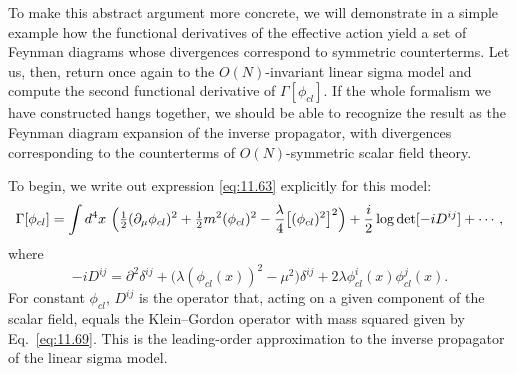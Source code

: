 To make this abstract argument more concrete, we will demonstrate in a simple
example how the functional derivatives of the effective action yield a set of
Feynman diagrams whose divergences correspond to symmetric counterterms.  Let
us, then, return once again to the $O(N)$-invariant linear sigma model and
compute the second functional derivative of $\Gamma[\phi_{cl}]$.  If the whole
formalism we have constructed hangs together, we should be able to recognize
the result as the Feynman diagram expansion of the inverse propagator, with
divergences corresponding to the counterterms of $O(N)$-symmetric scalar
field theory.

To begin, we write out expression \eqref{eq:11.63} explicitly for this model:
\begin{equation}
  \Gamma[\phi_{cl}] = \int d^4x\ \Bigl( \tfrac{1}{2}(\partial_\mu\phi_{cl})^2
    + \tfrac{1}{2}m^2(\phi_{cl})^2 - \frac{\lambda}{4}\bigl[ (\phi_{cl})^2
      \bigr]^2 \Bigr) + \frac{i}{2}\log\det[-iD^{ij}] + \cdots ,
  \label{eq:11.99}
\end{equation}
where
\begin{equation}
  -iD^{ij} = \partial^2\delta^{ij} + \bigl( \lambda(\phi_{cl}(x))^2 - \mu^2
    \bigr)\delta^{ij} + 2\lambda\phi^i_{cl}(x)\phi^j_{cl}(x) .
  \label{eq:11.100}
\end{equation}
For constant $\phi_{cl}$, $D^{ij}$ is the operator that, acting on a given
component of the scalar field, equals the Klein--Gordon operator with mass
squared given by Eq.~\eqref{eq:11.69}.  This is the leading-order
approximation to the inverse propagator of the linear sigma model.

